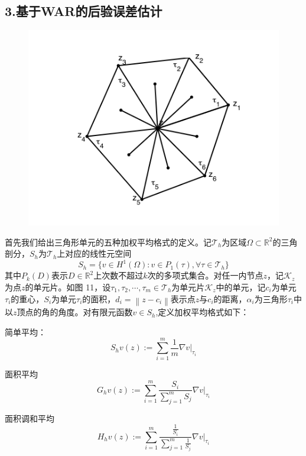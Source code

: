 \documentclass{article}
\begin{document}
\subsection{3.基于WAR的后验误差估计}
\begin{figure}[H]
\centering
\includegraphics[scale=0.5]{./figures/Figure_24.png}
\caption{}
\end{figure}
首先我们给出三角形单元的五种加权平均格式的定义。记$\mathcal{T}_h$为区域$\Omega\subset\mathbb{R}^2$的三角剖分，$S_h$为$\mathcal{T}_h$上对应的线性元空间
\begin{equation*}
S_h=\{v\in H^1(\Omega):v \in P_1(\tau),\forall\tau\in\mathcal{T}_h\}
\end{equation*}
其中$P_k(D)$表示$D\in\mathbb{R}^2$上次数不超过$k$次的多项式集合。对任一内节点$z$，记$\mathcal{K}_z$为点$z$的单元片。如图 11，设$\tau_1,\tau_2,\cdots,\tau_m\in \mathcal{T}_h$为单元片$\mathcal{K}_z$中的单元，记$c_i$为单元$\tau_i$的重心，$S_i$为单元$\tau_i$的面积，$d_i=\left\|z-c_i\right\|$表示点$z$与$c_i$的距离，$\alpha_i$为三角形$\tau_i$中以$z$顶点的角的角度。对有限元函数$v\in S_h$,定义加权平均格式如下：

简单平均：
\begin{equation*}
S_hv(z):=\sum\limits_{i=1}^m\frac{1}{m}\nabla v\big|_{\tau_i}
\end{equation*}

面积平均
\begin{equation*}
G_hv(z):=\sum\limits_{i=1}^m\frac{S_i}{\sum\limits_{j=1}^mS_j}\nabla v\big|_{\tau_i}
\end{equation*}

面积调和平均
\begin{equation*}
H_hv(z):=\sum\limits_{i=1}^m\frac{\frac{1}{S_i}}{\sum\limits_{j=1}^m\frac{1}{S_j}}\nabla v\big|_{\tau_i}
\end{equation*}
\end{document}
